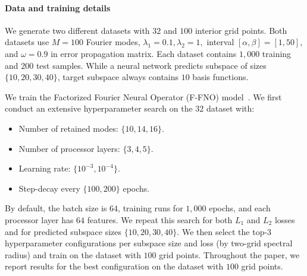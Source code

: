 \documentclass{article}
\begin{document}
\paragraph{Data and training details}
We generate two different datasets with $32$ and $100$ interior grid points. Both datasets use $M=100$ Fourier modes, $\lambda_1=0.1, \lambda_2=1,$ interval $[\alpha, \beta]=[1,50]$, and $\omega=0.9$ in error propagation matrix. Each dataset contains $1,000$ training and $200$ test samples. While a neural network predicts subspace of sizes $\{10, 20, 30, 40\}$, target subspace always contains $10$ basis functions.

We train the Factorized Fourier Neural Operator (F-FNO) model~\cite{tran2021factorized}. We first conduct an extensive hyperparameter search on the $32$ dataset with:
\begin{itemize}
    \item Number of retained modes: $\{10, 14, 16\}$.
    \item Number of processor layers: $\{3,4,5\}$.
    \item Learning rate: $\{10^{-3}, 10^{-4}\}$.
    \item Step-decay every $\{100, 200\}$ epochs.
\end{itemize}

By default, the batch size is $64$, training runs for $1,000$ epochs, and each processor layer has $64$ features. We repeat this search for both $L_1$ and $L_2$ losses and for predicted subspace sizes $\{10, 20, 30, 40\}$. We then select the top-$3$ hyperparameter configurations per subspace size and loss (by two-grid spectral radius) and train on the dataset with $100$ grid points. Throughout the paper, we report results for the best configuration on the dataset with $100$ grid points.
\end{document}
